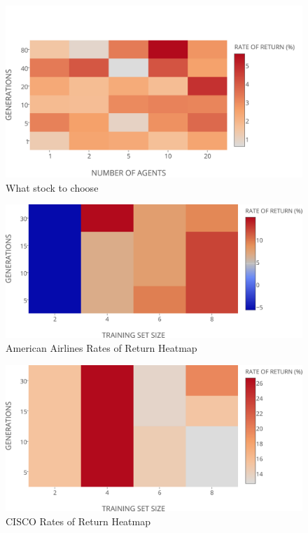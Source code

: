 \documentclass[12pt,journal,compsoc]{IEEEtran}
\begin{document}
\begin{figure}[h!]
\begin{center}
\includegraphics[width=1.00\columnwidth]{figures/rates-of-return-heatmap/rates-of-return-heatmap}
\caption{{\label{rates-of-return-heatmap}What stock to choose%
}}
\end{center}
\end{figure}

\begin{figure}[h!]
\begin{center}
\includegraphics[width=1.00\columnwidth]{figures/rates-of-return-aa-heatmap/rates-of-return-aa-heatmap}
\caption{{\label{aa-ror-heatmap}American Airlines Rates of Return Heatmap%
}}
\end{center}
\end{figure}

\begin{figure}[h!]
\begin{center}
\includegraphics[width=1.00\columnwidth]{figures/rates-of-return-csco-heatmap/rates-of-return-csco-heatmap}
\caption{{\label{csco-ror-heatmap}CISCO Rates of Return Heatmap%
}}
\end{center}
\end{figure}
\end{document}
